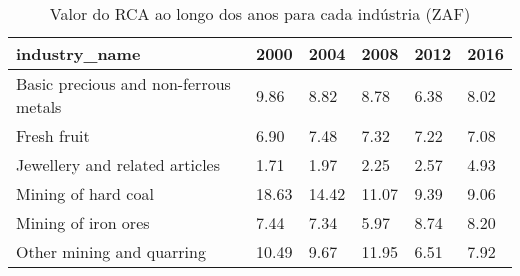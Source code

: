 \begin{table}
\centering
\caption{Valor do RCA ao longo dos anos para cada indústria (ZAF)}
\begin{tabular}{p{6cm}p{1.5cm}p{1.5cm}p{1.5cm}p{1.5cm}p{1.5cm}}
\toprule
                        industry\_name &  2000 &  2004 &  2008 & 2012 & 2016 \\
\midrule
Basic precious and non-ferrous metals &  9.86 &  8.82 &  8.78 & 6.38 & 8.02 \\
                          Fresh fruit &  6.90 &  7.48 &  7.32 & 7.22 & 7.08 \\
       Jewellery and related articles &  1.71 &  1.97 &  2.25 & 2.57 & 4.93 \\
                  Mining of hard coal & 18.63 & 14.42 & 11.07 & 9.39 & 9.06 \\
                  Mining of iron ores &  7.44 &  7.34 &  5.97 & 8.74 & 8.20 \\
            Other mining and quarring & 10.49 &  9.67 & 11.95 & 6.51 & 7.92 \\
\bottomrule
\end{tabular}
\end{table}
